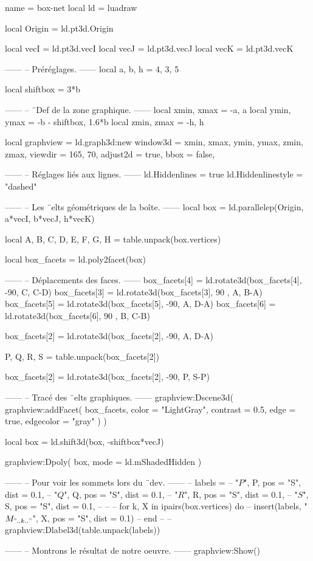 \documentclass[border = 3pt]{standalone}
\begin{document}
\begin{luadraw*}{name = box-net}
local ld = luadraw

local Origin = ld.pt3d.Origin

local vecI = ld.pt3d.vecI
local vecJ = ld.pt3d.vecJ
local vecK = ld.pt3d.vecK

------
-- Préréglages.
------
local a, b, h = 4, 3, 5

local shiftbox = 3*b

------
-- ¨Def de la zone graphique.
------
local xmin, xmax = -a, a
local ymin, ymax = -b - shiftbox, 1.6*b
local zmin, zmax = -h, h

local graphview = ld.graph3d:new{
  window3d = {xmin, xmax, ymin, ymax, zmin, zmax},
  viewdir  = {165, 70},
  adjust2d = true,
  bbox     = false,
}

------
-- Réglages liés aux lignes.
------
ld.Hiddenlines     = true
ld.Hiddenlinestyle = "dashed"

------
-- Les ¨elts géométriques de la boîte.
------
local box = ld.parallelep(Origin, a*vecI, b*vecJ, h*vecK)

local A, B, C, D, E, F, G, H = table.unpack(box.vertices)

local box_facets = ld.poly2facet(box)

------
-- Déplacements des faces.
------
box_facets[4] = ld.rotate3d(box_facets[4], -90, {C, C-D})
box_facets[3] = ld.rotate3d(box_facets[3], 90 , {A, B-A})
box_facets[5] = ld.rotate3d(box_facets[5], -90, {A, D-A})
box_facets[6] = ld.rotate3d(box_facets[6], 90 , {B, C-B})

box_facets[2] = ld.rotate3d(box_facets[2], -90, {A, D-A})

P, Q, R, S = table.unpack(box_facets[2])

box_facets[2] = ld.rotate3d(box_facets[2], -90, {P, S-P})

------
-- Tracé des ¨elts graphiques.
------
graphview:Dscene3d(
  graphview:addFacet(
    box_facets,
    {
      color     = "LightGray",
      contrast  = 0.5,
      edge      = true,
      edgecolor = "gray"
    }
  )
)

local box = ld.shift3d(box, -shiftbox*vecJ)

graphview:Dpoly(
  box,
  {mode = ld.mShadedHidden}
)

------
-- Pour voir les sommets lors du ¨dev.
------
-- labels = {
--   "$P$", P, {pos = "S", dist = 0.1},
--   "$Q$", Q, {pos = "S", dist = 0.1},
--   "$R$", R, {pos = "S", dist = 0.1},
--   "$S$", S, {pos = "S", dist = 0.1},
-- }
--
-- for k, X in ipairs(box.vertices) do
--   insert(labels, {"$M_{".. k .."}$", X, {pos = "S", dist = 0.1}})
-- end
--
-- graphview:Dlabel3d(table.unpack(labels))

------
-- Montrons le résultat de notre oeuvre.
------
graphview:Show()
\end{luadraw*}
\end{document}

